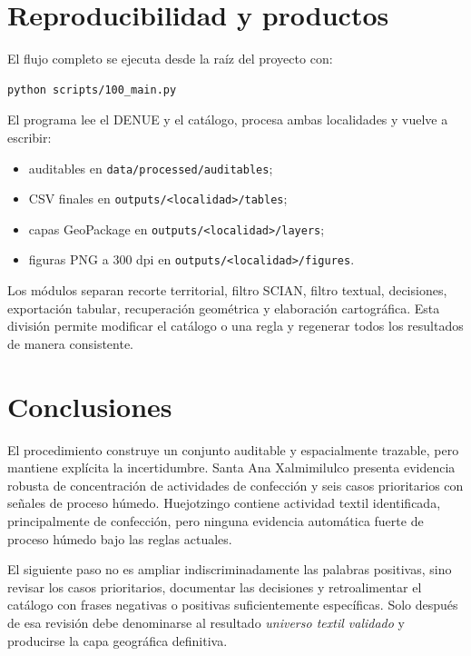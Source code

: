 \documentclass[11pt,letterpaper]{article}
\begin{document}
\section{Reproducibilidad y productos}

El flujo completo se ejecuta desde la raíz del proyecto con:

\begin{verbatim}
python scripts/100_main.py
\end{verbatim}

El programa lee el DENUE y el catálogo, procesa ambas localidades y vuelve a escribir:

\begin{itemize}
  \item auditables en \texttt{data/processed/auditables};
  \item CSV finales en \texttt{outputs/<localidad>/tables};
  \item capas GeoPackage en \texttt{outputs/<localidad>/layers};
  \item figuras PNG a 300 dpi en \texttt{outputs/<localidad>/figures}.
\end{itemize}

Los módulos separan recorte territorial, filtro SCIAN, filtro textual, decisiones, exportación tabular, recuperación geométrica y elaboración cartográfica. Esta división permite modificar el catálogo o una regla y regenerar todos los resultados de manera consistente.

\section{Conclusiones}

El procedimiento construye un conjunto auditable y espacialmente trazable, pero mantiene explícita la incertidumbre. Santa Ana Xalmimilulco presenta evidencia robusta de concentración de actividades de confección y seis casos prioritarios con señales de proceso húmedo. Huejotzingo contiene actividad textil identificada, principalmente de confección, pero ninguna evidencia automática fuerte de proceso húmedo bajo las reglas actuales.

El siguiente paso no es ampliar indiscriminadamente las palabras positivas, sino revisar los casos prioritarios, documentar las decisiones y retroalimentar el catálogo con frases negativas o positivas suficientemente específicas. Solo después de esa revisión debe denominarse al resultado \emph{universo textil validado} y producirse la capa geográfica definitiva.
\end{document}
